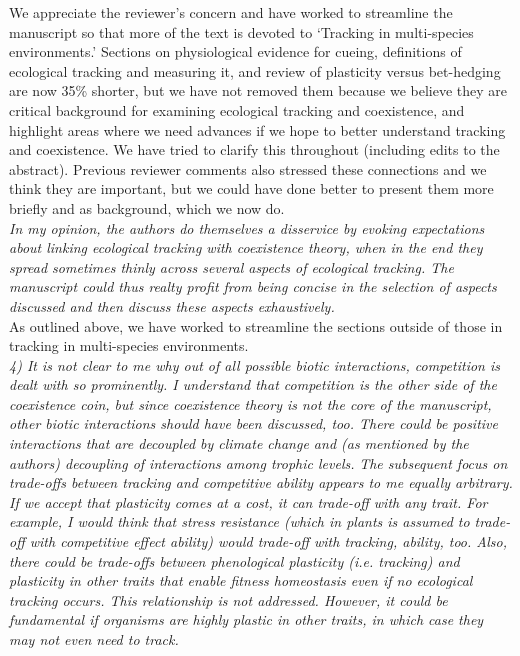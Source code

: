 \documentclass[11pt,letterpaper]{article}
\begin{document}
We appreciate the reviewer's concern and have worked to streamline the manuscript so that more of the text is devoted to `Tracking in multi-species environments.' Sections on physiological evidence for cueing, definitions of ecological
tracking and measuring it, and review of plasticity versus bet-hedging are now 35\% shorter, but we have not removed them because we believe they are critical background for examining ecological tracking and coexistence, and highlight areas where we need advances if we hope to better understand tracking and coexistence. We have tried to clarify this throughout (including edits to the abstract). Previous reviewer comments also stressed these connections and we think they are important, but we could have done better to present them more briefly and as background, which we now do. \\

\emph{In my opinion, the authors do themselves a disservice by evoking expectations about linking
ecological tracking with coexistence theory, when in the end they spread sometimes thinly
across several aspects of ecological tracking. The manuscript could thus realty profit from
being concise in the selection of aspects discussed and then discuss these aspects
exhaustively.}\\

As outlined above, we have worked to streamline the sections outside of those in tracking in multi-species environments.\\

\emph{4) It is not clear to me why out of all possible biotic interactions, competition is dealt
with so prominently. I understand that competition is the other side of the coexistence coin,
but since coexistence theory is not the core of the manuscript, other biotic interactions
should have been discussed, too. There could be positive interactions that are decoupled by
climate change and (as mentioned by the authors) decoupling of interactions among trophic
levels.}
\emph{The subsequent focus on trade-offs between tracking and competitive ability appears to me
equally arbitrary. If we accept that plasticity comes at a cost, it can trade-off with any
trait. For example, I would think that stress resistance (which in plants is assumed to
trade-off with competitive effect ability) would trade-off with tracking, ability, too. Also,
there could be trade-offs between phenological plasticity (i.e. tracking) and plasticity in
other traits that enable fitness homeostasis even if no ecological tracking occurs. This
relationship is not addressed. However, it could be fundamental if organisms are highly
plastic in other traits, in which case they may not even need to track.}\\
\end{document}
